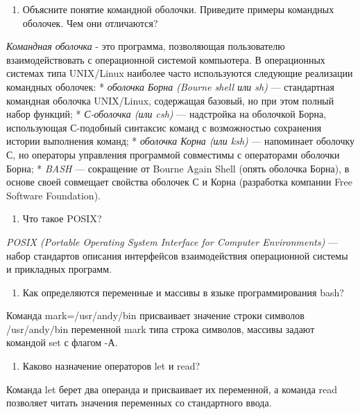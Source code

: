 \begin{enumerate}
\def\labelenumi{\arabic{enumi}.}
\tightlist
\item
  Объясните понятие командной оболочки. Приведите примеры командных
  оболочек. Чем они отличаются?
\end{enumerate}

\emph{Командная оболочка} - это программа, позволяющая пользователю
взаимодействовать с операционной системой компьютера. В операционных
системах типа UNIX/Linux наиболее часто используются следующие
реализации командных оболочек: * \emph{оболочка Борна (Bourne shell или
sh)} --- стандартная командная оболочка UNIX/Linux, содержащая базовый,
но при этом полный набор функций; * \emph{С-оболочка (или csh)} ---
надстройка на оболочкой Борна, использующая С-подобный синтаксис команд
с возможностью сохранения истории выполнения команд; * \emph{оболочка
Корна (или ksh)} --- напоминает оболочку С, но операторы управления
программой совместимы с операторами оболочки Борна; * \emph{BASH} ---
сокращение от Bourne Again Shell (опять оболочка Борна), в основе своей
совмещает свойства оболочек С и Корна (разработка компании Free Software
Foundation).

\begin{enumerate}
\def\labelenumi{\arabic{enumi}.}
\setcounter{enumi}{1}
\tightlist
\item
  Что такое POSIX?
\end{enumerate}

\emph{POSIX (Portable Operating System Interface for Computer
Environments)} --- набор стандартов описания интерфейсов взаимодействия
операционной системы и прикладных программ.

\begin{enumerate}
\def\labelenumi{\arabic{enumi}.}
\setcounter{enumi}{2}
\tightlist
\item
  Как определяются переменные и массивы в языке программирования bash?
\end{enumerate}

Команда mark=/usr/andy/bin присваивает значение строки символов
/usr/andy/bin переменной mark типа строка символов, массивы задают
командой set с флагом -А.

\begin{enumerate}
\def\labelenumi{\arabic{enumi}.}
\setcounter{enumi}{3}
\tightlist
\item
  Каково назначение операторов let и read?
\end{enumerate}

Команда let берет два операнда и присваивает их переменной, а команда
read позволяет читать значения переменных со стандартного ввода.

